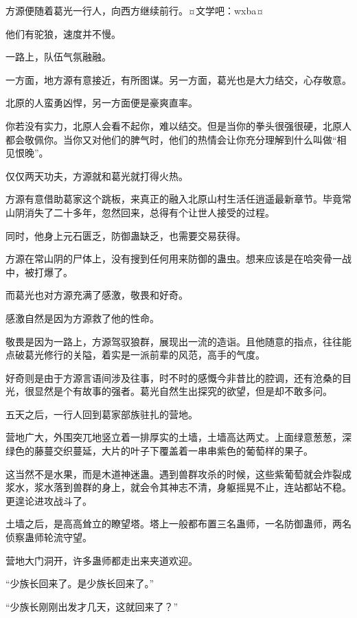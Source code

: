 
\begin{this_body}

方源便随着葛光一行人，向西方继续前行。¤文学吧：wxba¤

他们有驼狼，速度并不慢。

一路上，队伍气氛融融。

一方面，地方源有意接近，有所图谋。另一方面，葛光也是大力结交，心存敬意。

北原的人蛮勇凶悍，另一方面便是豪爽直率。

你若没有实力，北原人会看不起你，难以结交。但是当你的拳头很强很硬，北原人都会敬佩你。当你又对他们的脾气时，他们的热情会让你充分理解到什么叫做“相见恨晚”。

仅仅两天功夫，方源就和葛光就打得火热。

方源有意借助葛家这个跳板，来真正的融入北原山村生活任逍遥最新章节。毕竟常山阴消失了二十多年，忽然回来，总得有个让世人接受的过程。

同时，他身上元石匮乏，防御蛊缺乏，也需要交易获得。

方源在常山阴的尸体上，没有搜到任何用来防御的蛊虫。想来应该是在哈突骨一战中，被打爆了。

而葛光也对方源充满了感激，敬畏和好奇。

感激自然是因为方源救了他的性命。

敬畏是因为一路上，方源驾驭狼群，展现出一流的造诣。且他随意的指点，往往能点破葛光修行的关隘，着实是一派前辈的风范，高手的气度。

好奇则是由于方源言语间涉及往事，时不时的感慨今非昔比的腔调，还有沧桑的目光，很显然是个有故事的强者。葛光自然生出探究的欲望，但是却不敢多问。

五天之后，一行人回到葛家部族驻扎的营地。

营地广大，外围突兀地竖立着一排厚实的土墙，土墙高达两丈。上面绿意葱葱，深绿色的藤蔓交织蔓延，大片的叶子下覆盖着一串串紫色的葡萄样的果子。

这当然不是水果，而是木道神迷蛊。遇到兽群攻杀的时候，这些紫葡萄就会炸裂成浆水，浆水落到兽群的身上，就会令其神志不清，身躯摇晃不止，连站都站不稳。更遑论进攻战斗了。

土墙之后，是高高耸立的瞭望塔。塔上一般都布置三名蛊师，一名防御蛊师，两名侦察蛊师轮流守望。

营地大门洞开，许多蛊师都走出来夹道欢迎。

“少族长回来了。是少族长回来了。”

“少族长刚刚出发才几天，这就回来了？”


\end{this_body}
